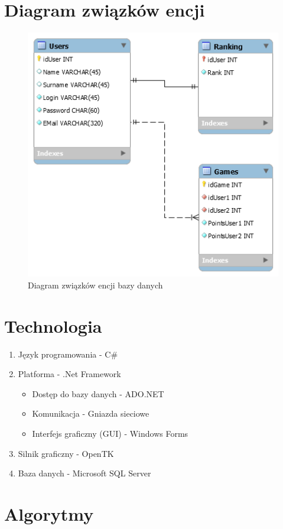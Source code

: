 \documentclass[12pt]{article}
\begin{document}
\section{Diagram związków encji}
\begin{figure}[!ht]
  \centering
	\includegraphics[scale=0.6]{erd}
	 \caption{Diagram związków encji bazy danych}
\end{figure}

\section{Technologia}
\begin{enumerate}
\item Język programowania - C\#
\item Platforma - .Net Framework 
\begin{itemize}
\item Dostęp do bazy danych - ADO.NET
\item Komunikacja - Gniazda sieciowe
\item Interfejs graficzny (GUI) - Windows Forms
\end{itemize}
\item Silnik graficzny - OpenTK
\item Baza danych - Microsoft SQL Server
\end{enumerate}


\section{Algorytmy}
\end{document}
